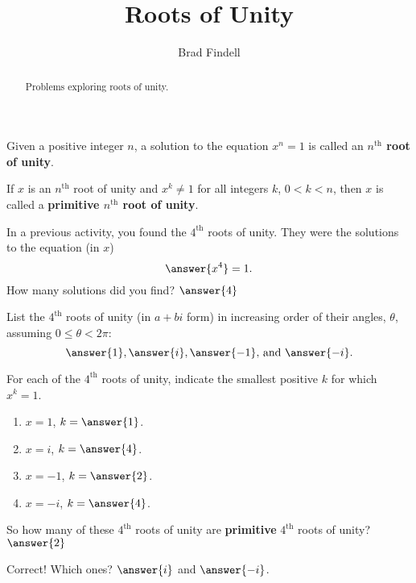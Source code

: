 \documentclass[space,nooutcomes]{ximera}
\title{Roots of Unity}
\author{Brad Findell}
\begin{document}
\begin{abstract}
Problems exploring roots of unity.   
\end{abstract}
\maketitle


\begin{definition}
Given a positive integer $n$, a solution to the equation $x^n=1$ is called an \textbf{$n^\text{th}$  root of unity}.    

If $x$ is an $n^\text{th}$ root of unity and $x^k\ne 1$ for all integers $k$, $0<k<n$, then $x$ is called a \textbf{primitive $n^\text{th}$ root of unity}.
\end{definition}
 
\begin{problem}
In a previous activity, you found the $4^\text{th}$ roots of unity.  They were the solutions to the equation (in $x$)
\[
\answer{x^4} = 1.  
\]
How many solutions did you find?  $\answer{4}$
\begin{problem}
List the $4^\text{th}$ roots of unity (in $a+bi$ form) in increasing order of their angles, $\theta$, assuming $0\le \theta<2\pi$: 
\[
\answer{1}, \answer{i}, \answer{-1}\text{, and }\answer{-i}. 
\]
\begin{problem}
For each of the $4^\text{th}$ roots of unity, indicate the smallest positive $k$ for which $x^k = 1$.  
\begin{enumerate}
\item $x=1$, $k=\answer{1}$.  
\item $x=i$, $k=\answer{4}$.
\item $x=-1$, $k=\answer{2}$.  
\item $x=-i$, $k=\answer{4}$.
\end{enumerate}
So how many of these $4^\text{th}$ roots of unity are \textbf{primitive} $4^\text{th}$ roots of unity?  
$\answer{2}$
\begin{problem}
Correct!  Which ones?  $\answer{i}$ and $\answer{-i}$.  
\end{problem}
\end{problem}
\end{problem}
\end{problem}
\end{document}
